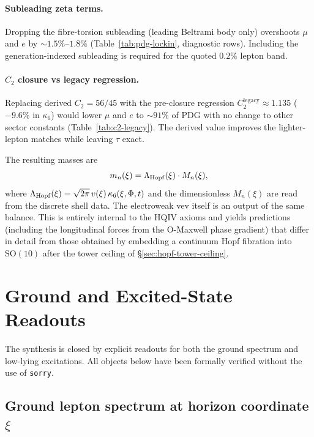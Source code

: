 \documentclass[11pt]{amsart}
\begin{document}
\paragraph{Subleading zeta terms.}
Dropping the fibre-torsion subleading (leading Beltrami body only) overshoots $\mu$ and $e$ by $\sim 1.5\%$--$1.8\%$ (Table~\ref{tab:pdg-lockin}, diagnostic rows). Including the generation-indexed subleading is required for the quoted $0.2\%$ lepton band.

\paragraph{$C_2$ closure vs legacy regression.}
Replacing derived $C_2=56/45$ with the pre-closure regression $C_2^{\mathrm{legacy}}\approx 1.135$ ($-9.6\%$ in $\kappa_6$) would lower $\mu$ and $e$ to $\sim 91\%$ of PDG with no change to other sector constants (Table~\ref{tab:c2-legacy}). The derived value improves the lighter-lepton matches while leaving $\tau$ exact.

The resulting masses are
\[
m_n(\xi)=\Lambda_{\rm Hopf}(\xi)\cdot M_n(\xi),
\]
where $\Lambda_{\rm Hopf}(\xi)=\sqrt{2\pi}\,v(\xi)\,\kappa_6(\xi,\Phi,t)$ and the dimensionless $M_n(\xi)$ are read from the discrete shell data. The electroweak vev itself is an output of the same balance. This is entirely internal to the HQIV axioms and yields predictions (including the longitudinal forces from the O-Maxwell phase gradient) that differ in detail from those obtained by embedding a continuum Hopf fibration into $\mathrm{SO}(10)$ after the tower ceiling of §\ref{sec:hopf-tower-ceiling}.

\section{Ground and Excited-State Readouts}

The synthesis is closed by explicit readouts for both the ground spectrum and low-lying excitations. All objects below have been formally verified without the use of \texttt{sorry}.

\subsection{Ground lepton spectrum at horizon coordinate \texorpdfstring{$\xi$}{xi}}
\end{document}
